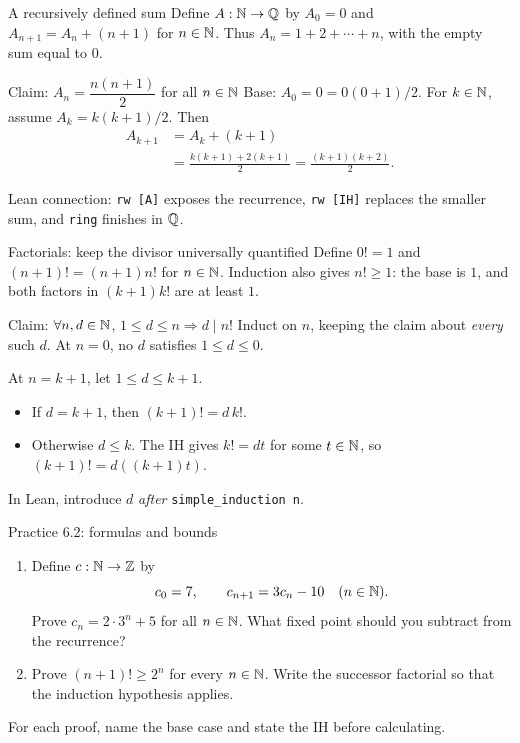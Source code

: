 \begin{frame}{A recursively defined sum}
Define $A:\mathbb{N}\to\mathbb{Q}$ by $A_0=0$ and
$A_{n+1}=A_n+(n+1)$ for $n\in\mathbb{N}$.
Thus $A_n=1+2+\cdots+n$, with the empty sum equal to $0$.
\begin{block}{Claim: $A_n=\dfrac{n(n+1)}2$ for all $n\in\mathbb{N}$}
Base: $A_0=0=0(0+1)/2$.
For $k\in\mathbb{N}$, assume $A_k=k(k+1)/2$. Then
\[
\begin{aligned}
 A_{k+1}&=A_k+(k+1)\\
 &=\frac{k(k+1)+2(k+1)}2
 =\frac{(k+1)(k+2)}2.
\end{aligned}
\]
\end{block}
Lean connection: \texttt{rw [A]} exposes the recurrence,
\texttt{rw [IH]} replaces the smaller sum, and \texttt{ring} finishes in $\mathbb{Q}$.
\end{frame}

\begin{frame}{Factorials: keep the divisor universally quantified}
Define $0!=1$ and $(n+1)!=(n+1)n!$ for $n\in\mathbb{N}$.
Induction also gives $n!\ge1$: the base is $1$, and both factors
in $(k+1)k!$ are at least $1$.
\begin{block}{Claim: $\forall n,d\in\mathbb{N}$, $1\le d\le n\Longrightarrow d\mid n!$}
Induct on $n$, keeping the claim about \emph{every} such $d$.
At $n=0$, no $d$ satisfies $1\le d\le0$.

At $n=k+1$, let $1\le d\le k+1$.
\begin{itemize}
\item If $d=k+1$, then $(k+1)!=d\,k!$.
\item Otherwise $d\le k$. The IH gives $k!=dt$ for some $t\in\mathbb{N}$,
so $(k+1)!=d((k+1)t)$.
\end{itemize}
\end{block}
In Lean, introduce $d$ \emph{after} \texttt{simple\_induction n}.
\end{frame}

\begin{frame}{Practice 6.2: formulas and bounds}
\begin{enumerate}
\item Define $c:\mathbb{N}\to\mathbb{Z}$ by
\[
 c_0=7,\qquad c_{n+1}=3c_n-10\quad(n\in\mathbb{N}).
\]
Prove $c_n=2\cdot3^n+5$ for all $n\in\mathbb{N}$.
What fixed point should you subtract from the recurrence?
\item Prove $(n+1)!\ge2^n$ for every $n\in\mathbb{N}$.
Write the successor factorial so that the induction hypothesis applies.
\end{enumerate}
For each proof, name the base case and state the IH before calculating.
\end{frame}

